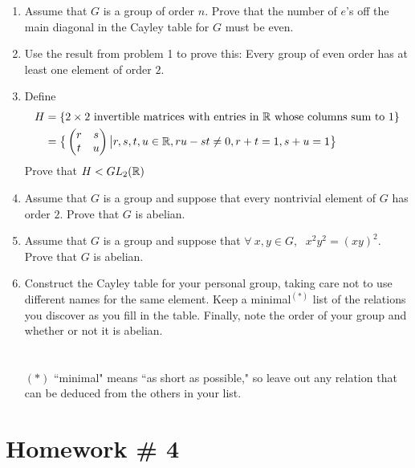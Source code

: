 \begin{enumerate}
    \item Assume that $G$ is a group of order $n$. Prove that the number of $e$'s off the main diagonal in the Cayley table for $G$ must be even. \\ \steezybreak
    
    \item Use the result from problem 1 to prove this: Every group of even order has at least one element of order $2$. \\ \steezybreak
    
    \item Define
    \begin{align}
        H&= \{2\times 2 \text{ invertible matrices with entries in }{\mathbb{ R}}\text{ whose columns sum to }1\} \nonumber \\
        &= \big\{\begin{pmatrix}
            r&s\\t&u
        \end{pmatrix}\big | r,s,t,u \in {\mathbb{ R}}, ru-st\neq 0, r+t=1, s+u=1\big\} \nonumber
    \end{align}
    Prove that $H<GL_2({\mathbb{ R}})$ \\ \steezybreak

    \item Assume that $G$ is a group and suppose that every nontrivial element of $G$ has order $2$. Prove that $G$ is abelian. \\ \steezybreak
    
    \item Assume that $G$ is a group and suppose that $\forall \ x,y \in G$, $\ \ x^2y^2=(xy)^2$. Prove that $G$ is abelian. \\ \steezybreak
    
    \item Construct the Cayley table for your personal group, taking care not to use different names for the same element. Keep a minimal$^{(*)}$ list of the relations you discover as you fill in the table. Finally, note the order of your group and whether or not it is abelian. \\ \\ \\ $(*)$ ``minimal" means ``as short as possible," so leave out any relation that can be deduced from the others in your list.
\end{enumerate}
\newpage

\section*{Homework \# 4}
\label{sec:HW4}

